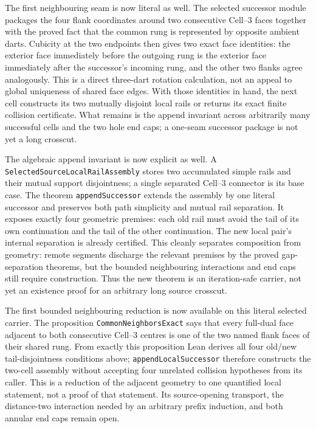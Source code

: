 \documentclass[11pt]{article}
\theoremstyle{definition}
\begin{document}
The first neighbouring seam is now literal as well.  The selected successor
module packages the four flank coordinates around two consecutive Cell--3
faces together with the proved fact that the common rung is represented by
opposite ambient darts.  Cubicity at the two endpoints then gives two exact
face identities: the exterior face immediately before the outgoing rung is
the exterior face immediately after the successor's incoming rung, and the
other two flanks agree analogously.  This is a direct three-dart rotation
calculation, not an appeal to global uniqueness of shared face edges.  With
those identities in hand, the next cell constructs its two mutually disjoint
local rails or returns its exact finite collision certificate.  What remains
is the append invariant across arbitrarily many successful cells and the two
hole end caps; a one-seam successor package is not yet a long crosscut.

The algebraic append invariant is now explicit as well.  A
\texttt{SelectedSourceLocalRailAssembly} stores two accumulated simple rails
and their mutual support disjointness; a single separated Cell--3 connector
is its base case.  The theorem \texttt{appendSuccessor} extends the assembly
by one literal successor and preserves both path simplicity and mutual rail
separation.  It exposes exactly four geometric premises: each old rail must
avoid the tail of its own continuation and the tail of the other
continuation.  The new local pair's internal separation is already certified.
This cleanly separates composition from geometry: remote segments discharge
the relevant premises by the proved gap-separation theorems, but the bounded
neighbouring interactions and end caps still require construction.  Thus the
new theorem is an iteration-safe carrier, not yet an existence proof for an
arbitrary long source crosscut.

The first bounded neighbouring reduction is now available on this literal
selected carrier.  The proposition
\texttt{CommonNeighborsExact} says that every full-dual face adjacent to both
consecutive Cell--3 centres is one of the two named flank faces of their
shared rung.  From exactly this proposition Lean derives all four old/new
tail-disjointness conditions above; \texttt{appendLocalSuccessor} therefore
constructs the two-cell assembly without accepting four unrelated collision
hypotheses from its caller.  This is a reduction of the adjacent geometry to
one quantified local statement, not a proof of that statement.  Its
source-opening transport, the distance-two interaction needed by an arbitrary
prefix induction, and both annular end caps remain open.
\end{document}
